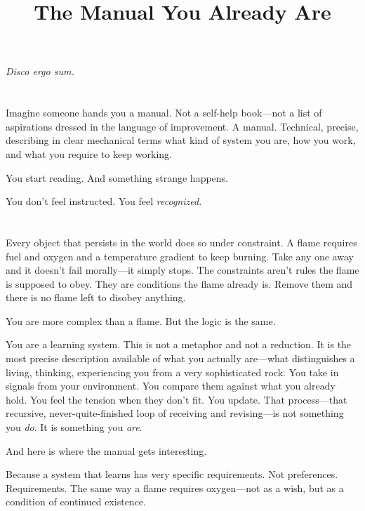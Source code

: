 \documentclass[11pt, a4paper]{article}
\title{\textbf{The Manual You Already Are}}
\author{}
\date{}
\begin{document}
\maketitle

\begin{center}
\epigraph{\itshape{Disco ergo sum.}}{}
\end{center}

\section*{}

Imagine someone hands you a manual. Not a self-help book—not a list of aspirations dressed in the language of improvement. A manual. Technical, precise, describing in clear mechanical terms what kind of system you are, how you work, and what you require to keep working.

You start reading. And something strange happens.

You don’t feel instructed. You feel \textit{recognized}.

\section*{}

Every object that persists in the world does so under constraint. A flame requires fuel and oxygen and a temperature gradient to keep burning. Take any one away and it doesn’t fail morally—it simply stops. The constraints aren’t rules the flame is supposed to obey. They are conditions the flame already is. Remove them and there is no flame left to disobey anything.

You are more complex than a flame. But the logic is the same.

You are a learning system. This is not a metaphor and not a reduction. It is the most precise description available of what you actually are—what distinguishes a living, thinking, experiencing you from a very sophisticated rock. You take in signals from your environment. You compare them against what you already hold. You feel the tension when they don’t fit. You update. That process—that recursive, never-quite-finished loop of receiving and revising—is not something you \textit{do}. It is something you \textit{are}.

And here is where the manual gets interesting.

Because a system that learns has very specific requirements. Not preferences. Requirements. The same way a flame requires oxygen—not as a wish, but as a condition of continued existence.
\end{document}
